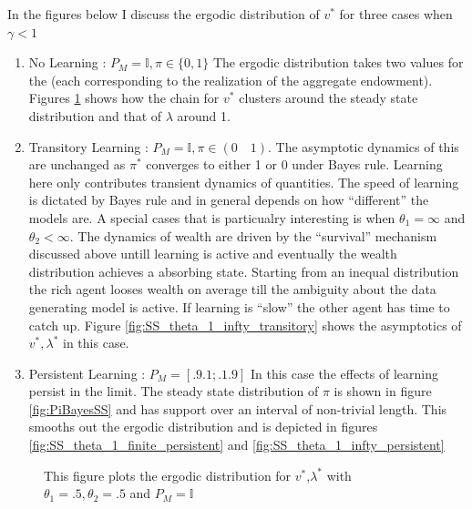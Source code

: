 \documentclass[12pt]{article}
\begin{document}
In the figures below I discuss the ergodic distribution of $v^*$ for three cases when $\gamma <1$
\begin{enumerate}	
\item No Learning : $P_M=\mathbb{I}, \pi \in \{0,1\}$ 
The ergodic distribution takes two values for the (each corresponding to the realization of the aggregate endowment). Figures \ref{fig:SS_theta_1_finite_transitory} shows how the chain for $v^*$ clusters around the steady state distribution and that of $\lambda$ around 1.

\item Transitory Learning : $P_M=\mathbb{I},  \pi \in(0 \quad 1)$. 
The asymptotic dynamics of this are unchanged as $\pi^*$ converges to either 1 or 0 under Bayes rule. Learning here only contributes transient dynamics of quantities. The speed of learning is dictated by Bayes rule and in general depends on how ``different'' the models are.  A special cases that is particualry interesting is when $\theta_1=\infty$ and $\theta_2 < \infty$. The dynamics of wealth are driven by the ``survival'' mechanism discussed above untill learning is active and eventually the wealth distribution achieves a absorbing state. Starting from an inequal distribution the rich agent looses wealth on average till the ambiguity about the data generating model is active. If learning is ``slow'' the other agent has time to catch up. Figure \ref{fig:SS_theta_1_infty_transitory} shows the asymptotics of $v^*,\lambda^*$ in this case.

\item Persistent Learning : $P_M = [.9 .1;.1 .9]$
In this case the effects of learning persist in the limit. The steady state distribution of $\pi$ is shown in figure  \ref{fig:PiBayesSS} and has support over an interval of non-trivial length. This smooths out the ergodic distribution and is depicted in figures \ref{fig:SS_theta_1_finite_persistent} and \ref{fig:SS_theta_1_infty_persistent}
\end{enumerate}

\begin{figure}[htbp]
\centering
{}
\caption{\small {This figure plots the ergodic distribution for $v^*$,$\lambda^*$ with $\theta_1=.5,\theta_2 =.5$ and $P_M=\mathbb{I}$}}
\label{fig:SS_theta_1_finite_transitory}
\end{figure} 
\end{document}

